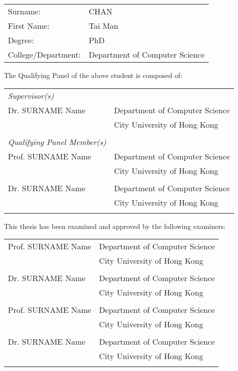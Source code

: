 
%

\begin{panel}

\begin{tabular}{p{40mm}p{80mm}}
Surname: & CHAN\tabularnewline
First Name: & Tai Man\tabularnewline
Degree: & PhD\tabularnewline
College/Department: & Department of Computer Science
\end{tabular}

\vspace{2em}

The Qualifying Panel of the above student is composed of:

\vspace{1em}

\begin{tabular}{p{50mm}p{80mm}}
\textit{Supervisor(s)} & \tabularnewline
Dr. SURNAME Name & Department of Computer Science\tabularnewline
 & City University of Hong Kong\\[1em]\tabularnewline

 
\textit{Qualifying Panel Member(s)} & \tabularnewline
Prof. SURNAME Name & Department of Computer Science\tabularnewline
 & City University of Hong Kong\\[.2em]\tabularnewline

Dr. SURNAME Name & Department of Computer Science\tabularnewline
 & City University of Hong Kong\\[.2em]\tabularnewline
\end{tabular}

\vspace{2em}

This thesis has been examined and approved by the following examiners:
\vspace{1em}

\begin{tabular}{p{50mm}p{80mm}}
Prof. SURNAME Name & Department of Computer Science\tabularnewline
 & City University of Hong Kong\\[.2em]\tabularnewline

Dr. SURNAME Name & Department of Computer Science\tabularnewline
 & City University of Hong Kong\\[.2em]\tabularnewline

Prof. SURNAME Name & Department of Computer Science\tabularnewline
 & City University of Hong Kong\\[.2em]\tabularnewline

Dr. SURNAME Name & Department of Computer Science\tabularnewline
 & City University of Hong Kong\\[.2em]\tabularnewline
\end{tabular}

\end{panel}
